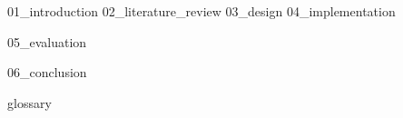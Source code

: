 \documentclass[12pt,oneside,a4paper]{book}
\begin{document}







\listoffigures

\listoftables



\pagebreak

\tableofcontents
\pagebreak

\newpage{}
\setcounter{page}{1}
 {01_introduction}
 {02_literature_review}
 {03_design}
 {04_implementation}

 {05_evaluation}

 {06_conclusion}




\clearpage
 {glossary}
\clearpage
{}

\printglossaries
\end{document}
